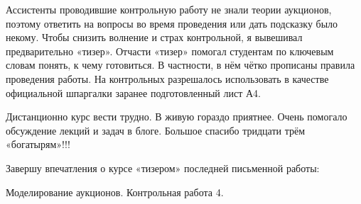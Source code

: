 \documentclass[11pt, openany]{book}
\numberwithin{equation}{page} %
\theoremstyle{definition} %
\theoremstyle{definition}
\theoremstyle{definition}
\begin{document}
Ассистенты проводившие контрольную работу не знали теории аукционов, поэтому ответить на вопросы во время проведения или дать подсказку было некому. Чтобы снизить волнение и страх контрольной, я вывешивал предварительно «тизер». Отчасти «тизер» помогал студентам по ключевым словам понять, к чему готовиться. В частности, в нём чётко прописаны правила проведения работы. На контрольных разрешалось использовать в качестве официальной шпаргалки заранее подготовленный лист А4.

Дистанционно курс вести трудно. В живую гораздо приятнее. Очень помогало обсуждение лекций и задач в блоге. Большое спасибо тридцати трём «богатырям»!!!

Завершу впечатления о курсе «тизером» последней письменной работы:

\begin{Large}
Моделирование аукционов. Контрольная работа 4.
\end{Large}
\end{document}
